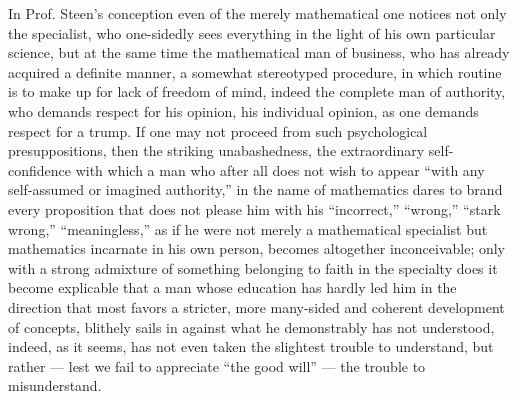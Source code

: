 \documentclass[12pt,a4paper,openany]{book}
\begin{document}
In Prof. Steen's conception even of the merely mathematical one notices not only the specialist, who one-sidedly
sees everything in the light of his own particular science, but at the same time the mathematical man of business, who has already acquired a
definite manner, a somewhat stereotyped procedure, in which
routine is to make up for lack of freedom of mind, indeed
the complete man of authority, who demands respect for his opinion, his individual opinion, as one demands respect for
a trump. If one may not proceed from such psychological
presuppositions, then the striking unabashedness, the
extraordinary self-confidence with which a man who after all
does not wish to appear ``with any self-assumed or imagined authority,'' in the name of mathematics dares to brand every proposition that
does not please him with his ``incorrect,'' ``wrong,'' ``stark wrong,''
``meaningless,'' as if he were not merely a mathematical specialist
but mathematics incarnate in his own person, becomes altogether
inconceivable; only with a strong admixture of something belonging to faith in the specialty
does it become explicable that a man whose education
has hardly led him in the direction that most favors
a stricter, more many-sided and coherent development of concepts,
blithely sails in against what he demonstrably has not understood,
indeed, as it seems, has not even taken the slightest trouble
to understand, but rather --- lest we fail to appreciate
``the good will'' --- the trouble to misunderstand.
\end{document}
